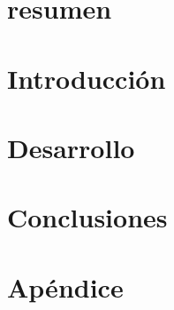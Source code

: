 


 



\section*{resumen}


\vspace{2em}
\tableofcontents
\newpage

\section{Introducción}

\newpage

\section{Desarrollo}

\newpage

\section{Conclusiones}

\newpage

\section{Apéndice}


%
%


